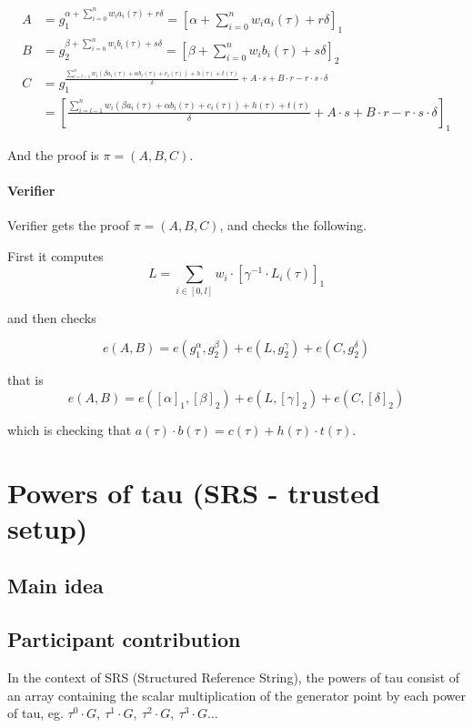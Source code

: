 \documentclass{article}
\begin{document}
\begin{align*}
    A &= g_1^{\alpha + \sum_{i=0}^n w_i a_i(\tau) + r \delta} = \left[\alpha + \sum_{i=0}^n w_i a_i(\tau) + r \delta \right]_1\\
    B &= g_2^{\beta + \sum_{i=0}^n w_i b_i(\tau) + s \delta} = \left[ \beta + \sum_{i=0}^n w_i b_i(\tau) + s \delta \right]_2\\
    C &= g_1^{\frac{\sum_{i=l-1}^n w_i (\beta a_i(\tau) + \alpha b_i(\tau) + c_i(\tau)) + h(\tau) + t(\tau)}{\delta} + A \cdot s + B \cdot r - r \cdot s \cdot \delta}\\
      &= \left[ \frac{\sum_{i=l-1}^n w_i (\beta a_i(\tau) + \alpha b_i(\tau) + c_i(\tau)) + h(\tau) + t(\tau)}{\delta} + A \cdot s + B \cdot r - r \cdot s \cdot \delta \right]_1
\end{align*}

And the proof is $\pi = (A, B, C)$.

\paragraph{Verifier}

Verifier gets the proof $\pi = (A, B, C)$, and checks the following.

First it computes
$$ L = \sum_{i \in [0,l]} w_i \cdot [\gamma^{-1} \cdot L_i(\tau)]_1$$

and then checks

$$e(A, B) = e(g_1^{\alpha}, g_2^{\beta}) + e(L, g_2^{\gamma}) + e(C, g_2^{\delta})$$

that is
$$e(A, B) = e([\alpha]_1, [\beta]_2) + e(L, [\gamma]_2) + e(C, [\delta]_2)$$

which is checking that $a(\tau) \cdot b(\tau) = c(\tau) + h(\tau) \cdot t(\tau)$.


\vspace{1.0cm}

\section{Powers of tau (SRS - trusted setup)}
\subsection{Main idea}

\subsection{Participant contribution}
In the context of SRS (Structured Reference String), the powers of tau consist of an array containing the scalar multiplication of the generator point by each power of tau, eg. $\tau^0 \cdot G,~\tau^1 \cdot G,~\tau^2 \cdot G,~\tau^3 \cdot G \ldots$
\end{document}
